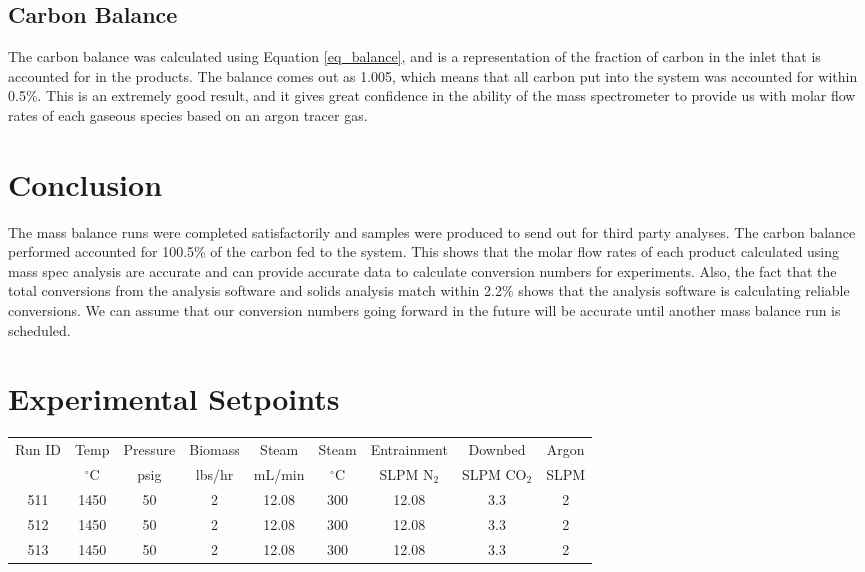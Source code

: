 \documentclass[11pt,twocolumn]{article}
\begin{document}
\subsection*{Carbon Balance}

The carbon balance was calculated using Equation \ref{eq_balance}, and is a representation of the fraction of carbon in the inlet that is accounted for in the products.  The balance comes out as 1.005, which means that all carbon put into the system was accounted for within 0.5\%.  This is an extremely good result, and it gives great confidence in the ability of the mass spectrometer to provide us with molar flow rates of each gaseous species based on an argon tracer gas.




\section*{Conclusion}

The mass balance runs were completed satisfactorily and samples were produced to send out for third party analyses.  The carbon balance performed accounted for 100.5\% of the carbon fed to the system.  This shows that the molar flow rates of each product calculated using mass spec analysis are accurate and can provide accurate data to calculate conversion numbers for experiments.  Also, the fact that the total conversions from the analysis software and solids analysis match within 2.2\% shows that the analysis software is calculating reliable conversions.  We can assume that our conversion numbers going forward in the future will be accurate until another mass balance run is scheduled.




\newpage
\appendix
\onecolumn



\section{Experimental Setpoints}
\label{ap_setpoints}

\begin{tabular}{c c c c c c c c c}
	\toprule
	\multirow{2}{*}{Run ID} &  Temp &  Pressure &  Biomass &  Steam &  Steam &  Entrainment & Downbed & Argon \\
	{}					& $^\circ$C & psig	& lbs/hr	& mL/min	& $^\circ$C	& SLPM N$_2$	&	SLPM CO$_2$	& SLPM	\\
	\midrule
	511    &       1450 &        50 &             2 &     12.08 &       300 &       12.08 &                3.3 &            2 \\
	512    &       1450 &        50 &             2 &     12.08 &       300 &       12.08 &                3.3 &            2 \\
	513    &       1450 &        50 &             2 &     12.08 &       300 &       12.08 &                3.3 &            2 \\
	\bottomrule
\end{tabular}
\end{document}
